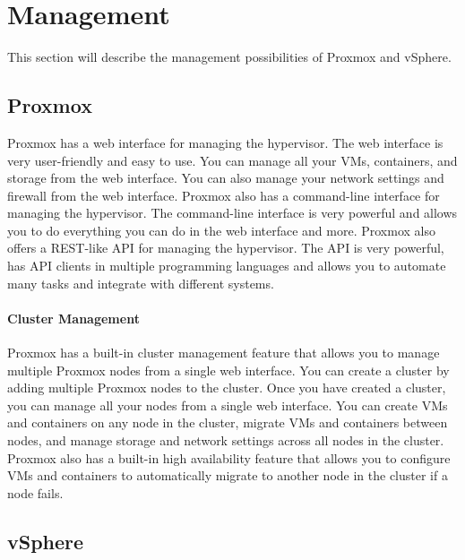 \section{Management}
This section will describe the management possibilities of Proxmox and vSphere. 

\subsection{Proxmox}
Proxmox has a web interface for managing the hypervisor. The web interface is very user-friendly and easy to use. You can manage all your VMs, containers, and storage from the web interface. You can also manage your network settings and firewall from the web interface. Proxmox also has a command-line interface for managing the hypervisor. The command-line interface is very powerful and allows you to do everything you can do in the web interface and more. Proxmox also offers a REST-like API for managing the hypervisor. The API is very powerful, has API clients in multiple programming languages and allows you to automate many tasks and integrate with different systems. 
\paragraph{Cluster Management} 
Proxmox has a built-in cluster management feature that allows you to manage multiple Proxmox nodes from a single web interface. You can create a cluster by adding multiple Proxmox nodes to the cluster. Once you have created a cluster, you can manage all your nodes from a single web interface. You can create VMs and containers on any node in the cluster, migrate VMs and containers between nodes, and manage storage and network settings across all nodes in the cluster. Proxmox also has a built-in high availability feature that allows you to configure VMs and containers to automatically migrate to another node in the cluster if a node fails. 

\subsection{vSphere}
